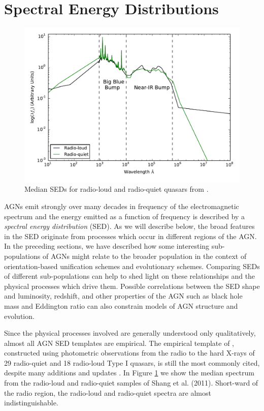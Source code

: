 \section{Spectral Energy Distributions}
\label{sec:sed}

\begin{figure}
  \centering
  \includegraphics[width=\textwidth]{figures/chapter01/shangsed.pdf}
  \caption{Median SEDs for radio-loud and radio-quiet quasars from \citet{shang11}.}
  \label{fig:seyfert_sed}
\end{figure}

AGNs emit strongly over many decades in frequency of the electromagnetic spectrum and the energy emitted as a function of frequency is described by a {\it spectral energy distribution} (SED). 
As we will describe below, the broad features in the SED originate from processes which occur in different regions of the AGN. 
In the preceding sections, we have described how some interesting sub-populations of AGNs might relate to the broader population in the context of orientation-based unification schemes and evolutionary schemes. 
Comparing SEDs of different sub-populations can help to shed light on these relationships and the physical processes which drive them. 
Possible correlations between the SED shape and luminosity, redshift, and other properties of the AGN such as black hole mass and Eddington ratio can also constrain models of AGN structure and evolution. 

Since the physical processes involved are generally understood only qualitatively, almost all AGN SED templates are empirical. 
The empirical template of \citet{elvis94}, constructed using photometric observations from the radio to the hard X-rays of 29 radio-quiet and 18 radio-loud Type I quasars, is still the most commonly cited, despite many additions and updates \citep[e.g.][]{polletta00, kuraszkiewicz03, risaliti04, richards06,  polletta07, lusso10, shang11, marchese12, trichas12}. 
In Figure \ref{fig:seyfert_sed} we show the median spectrum from the radio-loud and radio-quiet samples of Shang et al. (2011). 
Short-ward of the radio region, the radio-loud and radio-quiet spectra are almost indistinguishable. 

